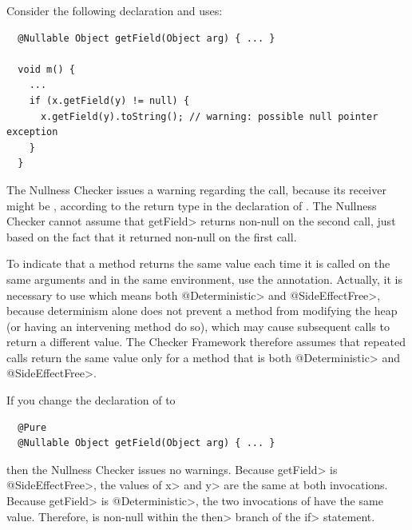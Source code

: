
Consider the following declaration and uses:

\begin{Verbatim}
  @Nullable Object getField(Object arg) { ... }

  void m() {
    ...
    if (x.getField(y) != null) {
      x.getField(y).toString(); // warning: possible null pointer exception
    }
  }
\end{Verbatim}

The Nullness Checker issues a warning regarding the
 call, because its receiver  might
be , according to the  return type in the
declaration of .  The Nullness Checker cannot assume that
\<getField> returns non-null on the second call, just based on the fact
that it returned non-null on the first call.

To indicate that a method returns the same value each time it is called on
the same arguments and in the same environment, use the
 annotation.
Actually, it is necessary to use  which
means both \<@Deterministic> and \<@SideEffectFree>, because determinism
alone does not prevent a method from modifying the heap (or having an
intervening method do so), which may cause subsequent calls to return a
different value.  The Checker Framework therefore assumes that repeated calls
return the same value only for a method that is both \<@Deterministic> and
\<@SideEffectFree>.

If you change the declaration of  to

\begin{Verbatim}
  @Pure
  @Nullable Object getField(Object arg) { ... }
\end{Verbatim}

\noindent
then the Nullness Checker issues no warnings.
Because \<getField> is \<@SideEffectFree>, the values of \<x> and \<y> are the
same at both invocations.
Because \<getField> is \<@Deterministic>, the two invocations of
 have the same value.
Therefore,  is non-null within the \<then> branch
of the \<if> statement.




